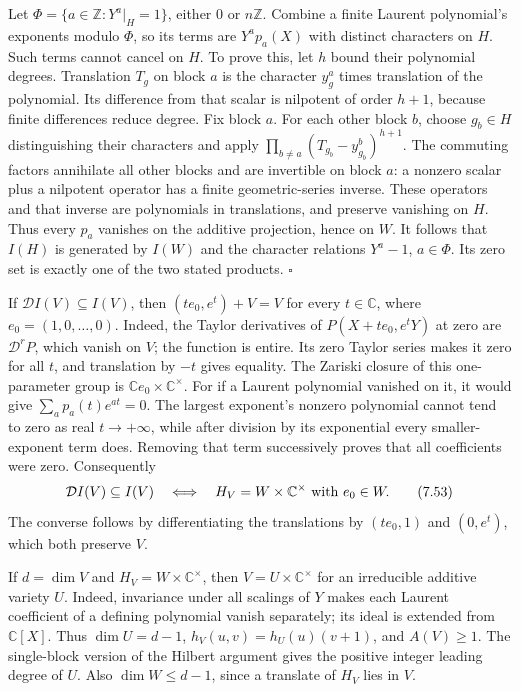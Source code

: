 \documentclass[
  11pt,
  a4paper,
]{article}
\begin{document}
Let \(\Phi=\{a\in\mathbb Z:Y^a|_H=1\}\), either \(0\) or \(n\mathbb Z\).
Combine a finite Laurent polynomial's exponents modulo \(\Phi\), so its
terms are \(Y^a p_a(X)\) with distinct characters on \(H\). Such terms
cannot cancel on \(H\). To prove this, let \(h\) bound their polynomial
degrees. Translation \(T_g\) on block \(a\) is the character \(y_g^a\)
times translation of the polynomial. Its difference from that scalar is
nilpotent of order \(h+1\), because finite differences reduce degree.
Fix block \(a\). For each other block \(b\), choose \(g_b\in H\)
distinguishing their characters and apply
\(\prod_{b\ne a}(T_{g_b}-y_{g_b}^b)^{h+1}\). The commuting factors
annihilate all other blocks and are invertible on block \(a\): a nonzero
scalar plus a nilpotent operator has a finite geometric-series inverse.
These operators and that inverse are polynomials in translations, and
preserve vanishing on \(H\). Thus every \(p_a\) vanishes on the additive
projection, hence on \(W\). It follows that \(I(H)\) is generated by
\(I(W)\) and the character relations \(Y^a-1\), \(a\in\Phi\). Its zero
set is exactly one of the two stated products. \(\square\)

If \(\mathcal D I(V)\subseteq I(V)\), then \((t e_0,e^t)+V=V\) for every
\(t\in\mathbb C\), where \(e_0=(1,0,\ldots,0)\). Indeed, the Taylor
derivatives of \(P(X+t e_0,e^tY)\) at zero are \(\mathcal D^rP\), which
vanish on \(V\); the function is entire. Its zero Taylor series makes it
zero for all \(t\), and translation by \(-t\) gives equality. The
Zariski closure of this one-parameter group is
\(\mathbb C e_0\times\mathbb C^\times\). For if a Laurent polynomial
vanished on it, it would give \(\sum_a p_a(t)e^{at}=0\). The largest
exponent's nonzero polynomial cannot tend to zero as real
\(t\to+\infty\), while after division by its exponential every
smaller-exponent term does. Removing that term successively proves that
all coefficients were zero. Consequently \[
\mathcal D I(V)\subseteq I(V)
\quad\Longleftrightarrow\quad
H_V=W\times\mathbb C^\times\ \hbox{with }e_0\in W.
\tag{7.53}
\] The converse follows by differentiating the translations by
\((t e_0,1)\) and \((0,e^t)\), which both preserve \(V\).

If \(d=\dim V\) and \(H_V=W\times\mathbb C^\times\), then
\(V=U\times\mathbb C^\times\) for an irreducible additive variety \(U\).
Indeed, invariance under all scalings of \(Y\) makes each Laurent
coefficient of a defining polynomial vanish separately; its ideal is
extended from \(\mathbb C[X]\). Thus \(\dim U=d-1\),
\(h_V(u,v)=h_U(u)(v+1)\), and \(A(V)\ge1\). The single-block version of
the Hilbert argument gives the positive integer leading degree of \(U\).
Also \(\dim W\le d-1\), since a translate of \(H_V\) lies in \(V\).
\end{document}

